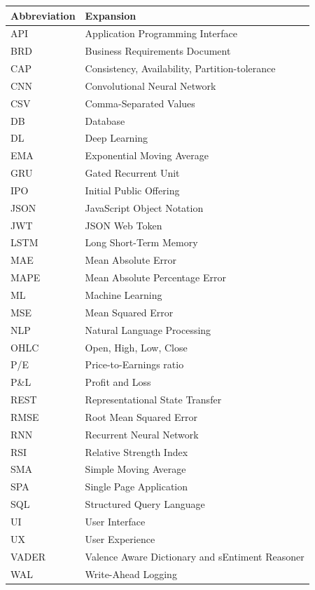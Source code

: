 \documentclass[12pt,a4paper]{report}
\numberwithin{equation}{chapter}
\begin{document}
\begin{longtable}{p{3cm} p{11cm}}
\toprule
\textbf{Abbreviation} & \textbf{Expansion} \\
\midrule
\endhead
API       & Application Programming Interface \\
BRD       & Business Requirements Document \\
CAP       & Consistency, Availability, Partition-tolerance \\
CNN       & Convolutional Neural Network \\
CSV       & Comma-Separated Values \\
DB        & Database \\
DL        & Deep Learning \\
EMA       & Exponential Moving Average \\
GRU       & Gated Recurrent Unit \\
IPO       & Initial Public Offering \\
JSON      & JavaScript Object Notation \\
JWT       & JSON Web Token \\
LSTM      & Long Short-Term Memory \\
MAE       & Mean Absolute Error \\
MAPE      & Mean Absolute Percentage Error \\
ML        & Machine Learning \\
MSE       & Mean Squared Error \\
NLP       & Natural Language Processing \\
OHLC      & Open, High, Low, Close \\
P/E       & Price-to-Earnings ratio \\
P\&L      & Profit and Loss \\
REST      & Representational State Transfer \\
RMSE      & Root Mean Squared Error \\
RNN       & Recurrent Neural Network \\
RSI       & Relative Strength Index \\
SMA       & Simple Moving Average \\
SPA       & Single Page Application \\
SQL       & Structured Query Language \\
UI        & User Interface \\
UX        & User Experience \\
VADER     & Valence Aware Dictionary and sEntiment Reasoner \\
WAL       & Write-Ahead Logging \\
\bottomrule
\end{longtable}
\end{document}
